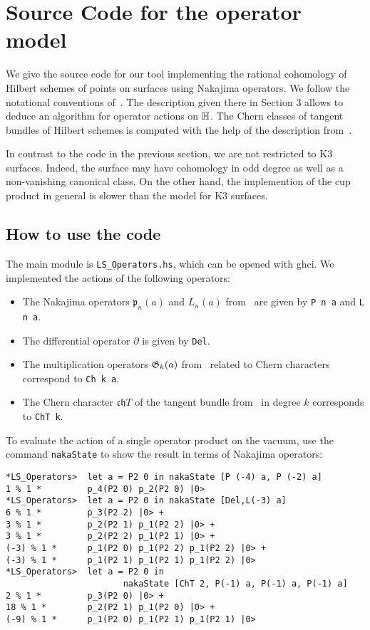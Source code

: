 
\section{Source Code for the operator model}\label{VertexCode}
We give the source code for our tool implementing the rational cohomology of Hilbert schemes of points on surfaces using Nakajima operators. 
We follow the notational conventions of~\cite{LehnSorger}. The description given there in Section 3 allows to deduce an algorithm for operator actions on $\mathbb{H}$. The Chern classes of  tangent bundles of Hilbert schemes is computed with the help of the description from~\cite[Section 3]{Boissiere}.

In contrast to the code in the previous section, we are not restricted to K3 surfaces. Indeed, the surface may have cohomology in odd degree as well as a non-vanishing canonical class. On the other hand, the implemention of the cup product in general is slower than the model for K3 surfaces. 

\subsection{How to use the code}
The main module is \verb|LS_Operators.hs|, which can be opened with ghci.
We implemented the actions of the following operators:
\begin{itemize}
 \item The Nakajima operators $\mathfrak p_n(a)$ and $L_n(a)$ from~\cite{LehnSorger} are given by \verb|P n a| and \verb|L n a|. 
 \item The differential operator $\partial$ is given by \verb|Del|.
 \item The multiplication operators $\mathfrak{G}_k(a)$ from~\cite{LiQinWang} related to Chern characters correspond to \verb|Ch k a|.
 \item The Chern character $\mathfrak{ch}T$ of the tangent bundle from~\cite{Boissiere} in degree $k$ corresponds to \verb|ChT k|.
\end{itemize}
\begin{example}
To evaluate the action of a single operator product on the vacuum, use the command \verb|nakaState| to show the result in terms of Nakajima operators:
\begin{verbatim}
*LS_Operators>  let a = P2 0 in nakaState [P (-4) a, P (-2) a]
1 % 1 *         p_4(P2 0) p_2(P2 0) |0>
*LS_Operators>  let a = P2 0 in nakaState [Del,L(-3) a]
6 % 1 *         p_3(P2 2) |0> +
3 % 1 *         p_2(P2 1) p_1(P2 2) |0> +
3 % 1 *         p_2(P2 2) p_1(P2 1) |0> +
(-3) % 1 *      p_1(P2 0) p_1(P2 2) p_1(P2 2) |0> +
(-3) % 1 *      p_1(P2 1) p_1(P2 1) p_1(P2 2) |0>
*LS_Operators>  let a = P2 0 in 
                       nakaState [ChT 2, P(-1) a, P(-1) a, P(-1) a]
2 % 1 *         p_3(P2 0) |0> +
18 % 1 *        p_2(P2 1) p_1(P2 0) |0> +
(-9) % 1 *      p_1(P2 0) p_1(P2 1) p_1(P2 1) |0>
\end{verbatim}
\end{example}

